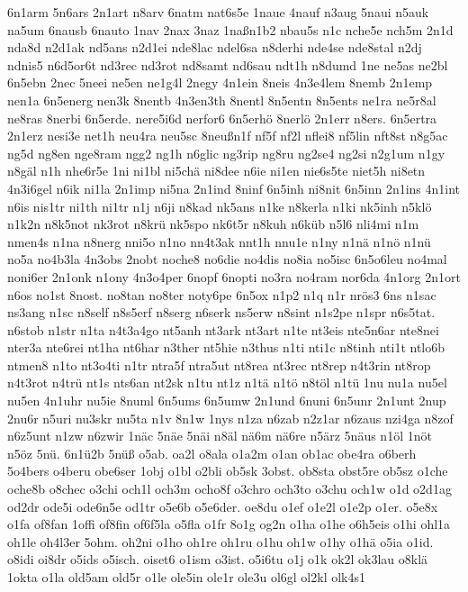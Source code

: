 {6n1arm 5n6ars 2n1art n8arv 6natm nat6s5e 1naue 4nauf n3aug 5naui n5auk
na5um 6nausb 6nauto 1nav 2nax 3naz 1na\ss  n1b2 nbau5s n1c
nche5e nch5m 2n1d nda8d n2d1ak nd5ans n2d1ei nde8lac ndel6sa n8derhi
nde4se nde8stal n2dj ndnis5 n6d5or6t nd3rec nd3rot nd8samt nd6sau
ndt1h n8dumd 1ne ne5as ne2bl 6n5ebn 2nec 5neei ne5en ne1g4l 2negy
4n1ein 8neis 4n3e4lem 8nemb 2n1emp nen1a 6n5energ nen3k 8nentb
4n3en3th 8nentl 8n5entn 8n5ents ne1ra ne5r8al ne8ras 8nerbi 6n5erde.
nere5i6d nerfor6 6n5erh\"o 8nerl\"o 2n1err n8ers.  6n5ertra
2n1erz nesi3e net1h neu4ra neu5sc 8neu\ss  n1f nf5f nf2l
nflei8 nf5lin nft8st n8g5ac ng5d ng8en nge8ram ngg2 ng1h n6glic ng3rip
ng8ru ng2se4 ng2si n2g1um n1gy n8g\"al n1h nhe6r5e 1ni ni1bl
ni5ch\"a ni8dee n6ie ni1en nie6s5te niet5h ni8etn 4n3i6gel n6ik
ni1la 2n1imp ni5na 2n1ind 8ninf 6n5inh ni8nit 6n5inn 2n1ins 4n1int
n6is 
nis1tr %
ni1th ni1tr n1j n6ji n8kad nk5ans n1ke n8kerla n1ki nk5inh
n5kl\"o n1k2n n8k5not nk3rot n8kr\"u nk5spo nk6t5r n8kuh
n6k\"ub n5l6 nli4mi n1m nmen4s n1na n8nerg nni5o n1no nn4t3ak nnt1h
nnu1e n1ny n1n\"a n1n\"o n1n\"u no5a no4b3la 4n3obs 2nobt
noche8 no6die no4dis no8ia no5isc 6n5o6leu no4mal noni6er 2n1onk n1ony
4n3o4per 6nopf 6nopti no3ra no4ram nor6da 4n1org 2n1ort n6os no1st
8nost.  no8tan no8ter noty6pe 6n5ox n1p2 n1q n1r nr\"os3 6ns n1sac
ns3ang n1sc n8self n8s5erf n8serg n6serk ns5erw n8sint n1s2pe n1spr
n6s5tat.  
n6stob n1str n1ta n4t3a4go nt5anh nt3ark nt3art
n1te nt3eis nte5n6ar nte8nei nter3a nte6rei nt1ha nt6har n3ther nt5hie
n3thus n1ti nti1c n8tinh nti1t ntlo6b ntmen8 n1to nt3o4ti n1tr ntra5f
ntra5ut nt8rea nt3rec nt8rep n4t3rin nt8rop n4t3rot n4tr\"u nt1s
nts6an nt2sk n1tu nt1z n1t\"a n1t\"o n8t\"ol n1t\"u 1nu
nu1a nu5el nu5en 4n1uhr nu5ie 8numl 6n5ums 6n5umw 2n1und 6nuni 6n5unr
2n1unt 2nup 2nu6r n5uri nu3skr nu5ta n1v 8n1w 1nys n1za n6zab n2z1ar
n6zaus nzi4ga n8zof n6z5unt n1zw n6zwir 1n\"ac 5n\"ae 5n\"ai
n8\"al n\"a6m n\"a6re n5\"arz 5n\"aus n1\"ol
1n\"ot n5\"oz 5n\"u. 6n1\"u2b 5n\"u\ss 
o5ab.  oa2l o8ala o1a2m o1an ob1ac obe4ra o6berh 5o4bers o4beru
obe6ser 1obj o1bl o2bli ob5sk 3obst.  ob8sta obst5re ob5sz o1che
oche8b o8chec o3chi och1l och3m ocho8f o3chro och3to o3chu och1w o1d
o2d1ag od2dr ode5i ode6n5e od1tr o5e6b o5e6der.  oe8du o1ef o1e2l
o1e2p o1er.  o5e8x o1fa of8fan 1offi of8fin of6f5la o5fla o1fr 8o1g
og2n o1ha o1he o6h5eis o1hi ohl1a oh1le oh4l3er 5ohm.  oh2ni o1ho
oh1re oh1ru o1hu oh1w o1hy o1h\"a o5ia o1id.  o8idi oi8dr o5ids
o5isch.  oiset6 o1ism o3ist.  o5i6tu o1j o1k ok2l ok3lau o8kl\"a
1okta o1la old5am old5r o1le ole5in ole1r ole3u ol6gl ol2kl olk4s1
}

